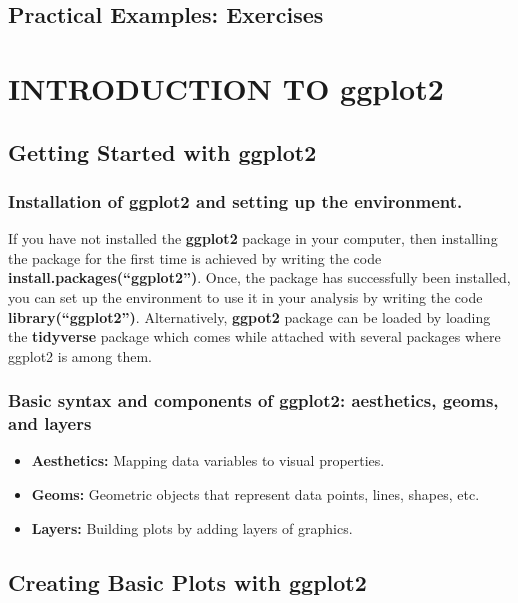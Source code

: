 \documentclass[
]{book}
\begin{document}
\section{Practical Examples: Exercises}\label{practical-examples-exercises-3}

\chapter{INTRODUCTION TO ggplot2}\label{introduction-to-ggplot2}

\section{Getting Started with ggplot2}\label{getting-started-with-ggplot2}

\subsection{Installation of ggplot2 and setting up the environment.}\label{installation-of-ggplot2-and-setting-up-the-environment.}

If you have not installed the \textbf{ggplot2} package in your computer, then installing the package for the first time is achieved by writing the code \textbf{install.packages(``ggplot2'')}. Once, the package has successfully been installed, you can set up the environment to use it in your analysis by writing the code \textbf{library(``ggplot2'')}. Alternatively, \textbf{ggpot2} package can be loaded by loading the \textbf{tidyverse} package which comes while attached with several packages where ggplot2 is among them.

\subsection{Basic syntax and components of ggplot2: aesthetics, geoms, and layers}\label{basic-syntax-and-components-of-ggplot2-aesthetics-geoms-and-layers}

\begin{itemize}
\item
  \textbf{Aesthetics:} Mapping data variables to visual properties.
\item
  \textbf{Geoms:} Geometric objects that represent data points, lines, shapes, etc.
\item
  \textbf{Layers:} Building plots by adding layers of graphics.
\end{itemize}

\section{Creating Basic Plots with ggplot2}\label{creating-basic-plots-with-ggplot2}
\end{document}

